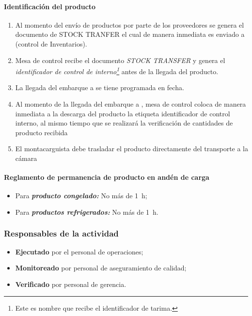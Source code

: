 \paragraph{Identificación del producto}

\begin{enumerate}
	\item Al momento del envío de productos por parte de los proveedores se genera el documento de STOCK TRANFER el cual de manera inmediata es enviado a  (control de Inventarios).
	\item Mesa de control recibe el documento \textit{STOCK TRANSFER} y genera el \emph{identificador de control de interno\footnote{Este es nombre que recibe el identificador de tarima.}} antes de la llegada del producto.
	\item La llegada del embarque a  se tiene programada en fecha.
	\item Al momento de la llegada del embarque a , mesa de control coloca de manera inmediata a la descarga del producto la etiqueta identificador de control interno, al mismo tiempo que se realizará la verificación de cantidades de producto recibida
	\item El montacarguista debe trasladar el producto directamente del transporte a la cámara
\end{enumerate}

\paragraph{Reglamento de permanencia de producto en andén de carga}

\begin{itemize}
	\item Para \emph{\textbf{producto congelado:}} No más de \qty{1}{\hour};
	\item Para \emph{\textbf{productos refrigerados:}} No más de \qty{1}{\hour}.
\end{itemize}


\subsubsection{Responsables de la actividad}

\begin{itemize}
	\item \textbf{Ejecutado} por el personal de operaciones;
	\item \textbf{Monitoreado} por personal de aseguramiento de calidad;
	\item \textbf{Verificado} por personal de gerencia.
\end{itemize}

